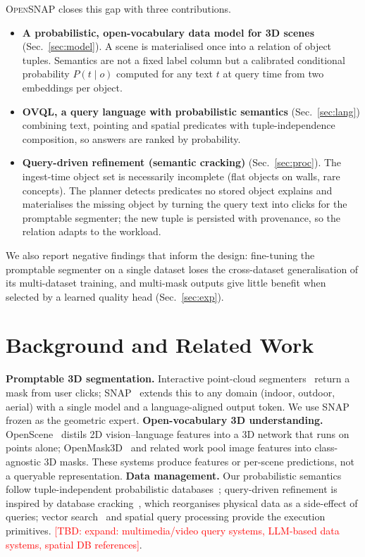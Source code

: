 \documentclass[conference]{IEEEtran}
\newcommand{\TBD}[1]{\textcolor{red}{[TBD: #1]}}
\newcommand{\sys}{\textsc{OpenSNAP}}
\newcommand{\ovql}{\textsc{OVQL}}
\begin{document}
\sys{} closes this gap with three contributions.
\begin{itemize}
\item \textbf{A probabilistic, open-vocabulary data model for 3D scenes} (Sec.~\ref{sec:model}). A scene is
materialised once into a relation of object tuples. Semantics are not a fixed label column but a calibrated
conditional probability $P(t\mid o)$ computed for any text $t$ at query time from two embeddings per object.
\item \textbf{\ovql{}, a query language with probabilistic semantics} (Sec.~\ref{sec:lang}) combining text, pointing and
spatial predicates with tuple-independence composition, so answers are ranked by probability.
\item \textbf{Query-driven refinement (semantic cracking)} (Sec.~\ref{sec:proc}). The ingest-time object set is
necessarily incomplete (flat objects on walls, rare concepts). The planner detects predicates no stored object
explains and materialises the missing object by turning the query text into clicks for the promptable segmenter; the
new tuple is persisted with provenance, so the relation adapts to the workload.
\end{itemize}
We also report negative findings that inform the design: fine-tuning the promptable segmenter on a single dataset
loses the cross-dataset generalisation of its multi-dataset training, and multi-mask outputs give little benefit
when selected by a learned quality head (Sec.~\ref{sec:exp}).

\section{Background and Related Work}
\textbf{Promptable 3D segmentation.} Interactive point-cloud segmenters~\cite{interobject3d,agile3d,interactive4d}
return a mask from user clicks; SNAP~\cite{snap} extends this to any domain (indoor, outdoor, aerial) with a single
model and a language-aligned output token. We use SNAP frozen as the geometric expert.
\textbf{Open-vocabulary 3D understanding.} OpenScene~\cite{openscene} distils 2D vision--language features into a 3D
network that runs on points alone; OpenMask3D~\cite{openmask3d} and related work pool image features into class-agnostic
3D masks. These systems produce features or per-scene predictions, not a queryable representation.
\textbf{Data management.} Our probabilistic semantics follow tuple-independent probabilistic databases~\cite{suciu};
query-driven refinement is inspired by database cracking~\cite{cracking}, which reorganises physical data as a
side-effect of queries; vector search~\cite{vectordb} and spatial query processing provide the execution primitives.
\TBD{expand: multimedia/video query systems, LLM-based data systems, spatial DB references}.
\end{document}
